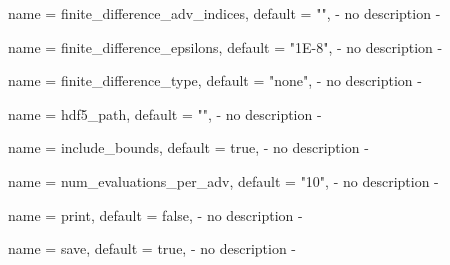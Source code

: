 \begin{parameter}{
    name    = {finite_difference_adv_indices},
    default = {""},
}
- no description -
\end{parameter}

\begin{parameter}{
    name    = {finite_difference_epsilons},
    default = {"1E-8"},
}
- no description -
\end{parameter}

\begin{parameter}{
    name    = {finite_difference_type},
    default = {"none"},
}
- no description -
\end{parameter}

\begin{parameter}{
    name    = {hdf5_path},
    default = {""},
}
- no description -
\end{parameter}

\begin{parameter}{
    name    = {include_bounds},
    default = {true},
}
- no description -
\end{parameter}

\begin{parameter}{
    name    = {num_evaluations_per_adv},
    default = {"10"},
}
- no description -
\end{parameter}

\begin{parameter}{
    name    = {print},
    default = {false},
}
- no description -
\end{parameter}

\begin{parameter}{
    name    = {save},
    default = {true},
}
- no description -
\end{parameter}

